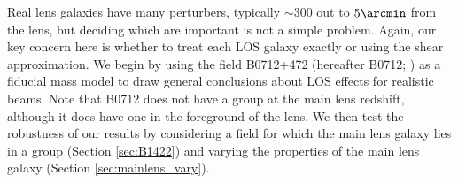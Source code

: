 Real lens galaxies have many perturbers, typically $\sim 300$ out to $5\arcmin$ from the lens, but deciding which are important is not a simple problem. Again, our key concern here is whether to treat each LOS galaxy exactly or using the shear approximation. We begin by using the field B0712+472 (hereafter B0712; \citealt{Jackson98}) as a fiducial mass model to draw general conclusions about LOS effects for realistic beams. Note that B0712 does not have a group at the main lens redshift, although it does have one in the foreground of the lens. We then test the robustness of our results by considering a field for which the main lens galaxy lies in a group (Section \ref{sec:B1422}) and varying the properties of the main lens galaxy (Section \ref{sec:mainlens_vary}).